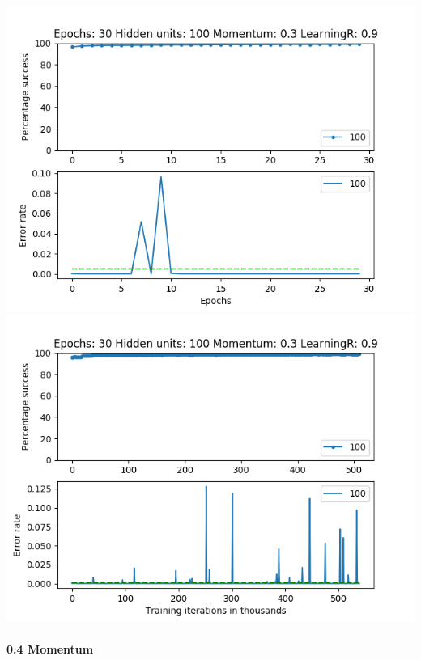 \documentclass[11pt]{article}
\makeatletter
\def\maxwidth{\ifdim\Gin@nat@width>\linewidth\linewidth
    \else\Gin@nat@width\fi}
\let\Oldincludegraphics\includegraphics
\renewcommand{\includegraphics}[1]{\Oldincludegraphics[width=.8\maxwidth]{#1}}
\makeatother
\begin{document}
\includegraphics{Experiment1/E1_NN_Epoch_Momentum_0.3_30Epochs_100_LR_0.9_Hiddenunits.png}
\includegraphics{Experiment1/E1_NN_Training_Momentum_0.3_30Epochs_100_LR_0.9_Hiddenunits.png}

\hypertarget{momentum-4}{%
\paragraph{0.4 Momentum}\label{momentum-4}}
\end{document}
